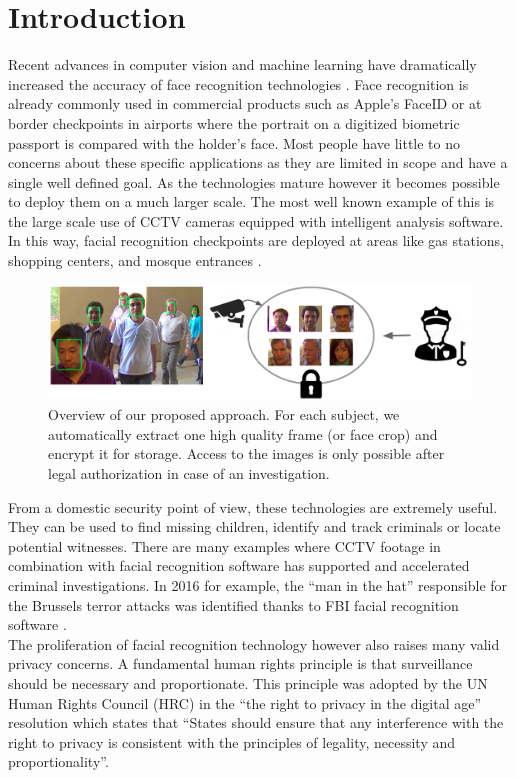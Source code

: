 \documentclass[letterpaper]{article} %
\begin{document}
\section{Introduction}
Recent advances in computer vision and machine learning have dramatically increased the accuracy of face recognition technologies \cite{schroff2015facenet, masi2018deep, deng2019arcface}. Face recognition is already commonly used in commercial products such as Apple's FaceID \cite{faceid} or at border checkpoints in airports where the portrait on a digitized biometric passport is compared with the holder's face. Most people have little to no concerns about these specific applications as they are limited in scope and have a single well defined goal. As the technologies mature however it becomes possible to deploy them on a much larger scale. The most well known example of this is the large scale use of CCTV cameras equipped with intelligent analysis software. In this way, facial recognition checkpoints are deployed at areas like gas stations, shopping centers, and mosque entrances \cite{larson2018china, NOS}.
\begin{figure}
\centering
\includegraphics[width=\linewidth]{figures/overview_.png}
\setlength{\abovecaptionskip}{-2pt}
\setlength{\belowcaptionskip}{-2pt}
\caption{Overview of our proposed approach. For each subject, we automatically extract one high quality frame (or face crop) and encrypt it for storage. Access to the images is only possible after legal authorization in case of an investigation.}
\label{fig:overview}
\end{figure}
From a domestic security point of view, these technologies are extremely useful. They can be used to find missing children, identify and track criminals or locate potential witnesses. There are many examples where CCTV footage in combination with facial recognition software has supported and accelerated criminal investigations. In 2016 for example, the ``man in the hat'' responsible for the Brussels terror attacks was identified thanks to FBI facial recognition software \cite{maninhat}.
\\
\newline
The proliferation of facial recognition technology however also raises many valid privacy concerns. A fundamental human rights principle is that surveillance should be necessary and proportionate. This principle was adopted by the UN Human Rights Council (HRC) in the ``the right to privacy in the digital age'' resolution which states that ``States should ensure that any interference with the right to privacy is consistent with the principles of legality, necessity and proportionality''\cite{unitednations}.
\end{document}
